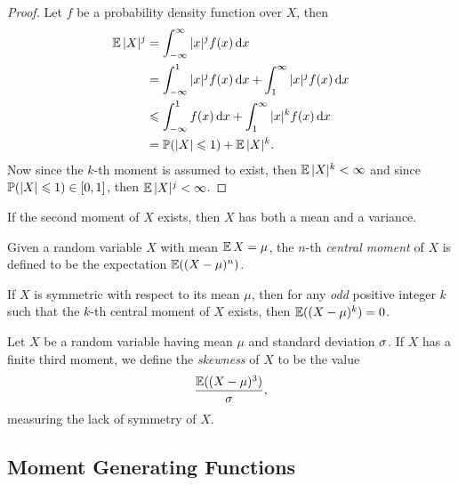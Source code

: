 \begin{proof}
Let \(f\) be a probability density function over \(X\), then
\begin{align*}
  \operatorname{\mathbb{E}} |X|^j
  &= \int_{-\infty}^{\infty} |x|^j f(x)\, \mathrm{d} x \\
  &= \int_{-\infty}^1 |x|^j f(x)\, \mathrm{d} x
    + \int_1^{\infty} |x|^j f(x)\, \mathrm{d} x \\
  &\leqslant \int_{-\infty}^1 f(x)\, \mathrm{d} x + \int_1^{\infty} |x|^k f(x)\, \mathrm{d} x \\
  &= \operatorname{\mathbb{P}}(|X| \leqslant 1) + \operatorname{\mathbb{E}} |X|^k.
\end{align*}
Now since the \(k\)-th moment is assumed to exist, then \(\operatorname{\mathbb{E}} |X|^k < \infty\)
and since \(\operatorname{\mathbb{P}}(|X| \leqslant 1) \in [0, 1]\), then \(\operatorname{\mathbb{E}} |X|^j < \infty\).
\end{proof}

\begin{corollary}
\label{cor:snd-moment--existence-mean-and-variance}
If the second moment of \(X\) exists, then \(X\) has both a mean and a variance.
\end{corollary}

\begin{definition}
\label{def:central-moment-random-variable}
Given a random variable \(X\) with mean \(\operatorname{\mathbb{E}} X = \mu\), the \(n\)-th
\emph{central moment} of \(X\) is defined to be the expectation
\(\operatorname{\mathbb{E}}((X - \mu)^n)\).
\end{definition}

\begin{corollary}
\label{cor:symmetric-wrt-mean-has-central-moment-zero}
If \(X\) is symmetric with respect to its mean \(\mu\), then for any \emph{odd}
positive integer \(k\) such that the \(k\)-th central moment of \(X\) exists,
then \(\operatorname{\mathbb{E}}((X - \mu)^k) = 0\).
\end{corollary}

\begin{definition}
\label{def:random-variable-skewness}
Let \(X\) be a random variable having mean \(\mu\) and standard deviation
\(\operatorname{\sigma}\). If \(X\) has a finite third moment, we define the \emph{skewness} of
\(X\) to be the value
\[
\frac{\operatorname{\mathbb{E}}((X - \mu)^3)}{\operatorname{\sigma}},
\]
measuring the lack of symmetry of \(X\).
\end{definition}

\subsection{Moment Generating Functions}

